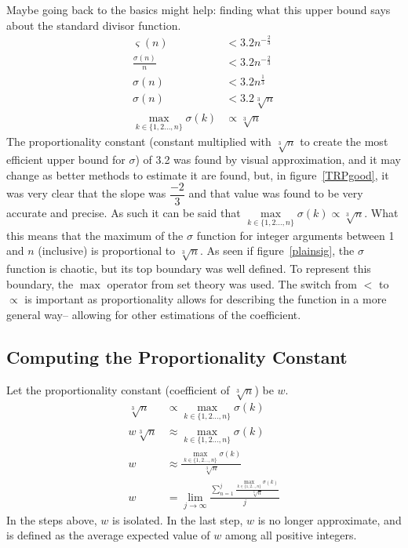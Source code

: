 \documentclass[12pt]{article}
\begin{document}
				Maybe going back to the basics might help: finding what this upper bound says about the standard divisor function.
				\begin{align*}
					\varsigma(n)&< 3.2n^{-\frac{2}{3}}\\
					\frac{\sigma(n)}{n}&< 3.2n^{-\frac{2}{3}}\\
					\sigma(n)&< 3.2n^{\frac{1}{3}}\\
					\sigma(n)&< 3.2\sqrt[3]{n}\\
					\max_{k\in\{1,2\ldots,n\}}\sigma(k)&\propto \sqrt[3]{n}
				\end{align*}
				The proportionality constant (constant multiplied with $\sqrt[3]{n}$ to create the most efficient upper bound for $\sigma$) of 3.2 was found by visual approximation, and it may change as better methods to estimate it are found, but, in figure~\ref{TRPgood}, it was very clear that the slope was $\dfrac{-2}{3}$ and that value was found to be very accurate and precise. As such it can be said that $\max\limits_{k\in\{1,2\ldots,n\}}\sigma(k)\propto \sqrt[3]{n}$. What this means that the maximum of the $\sigma$ function for integer arguments between 1 and $n$ (inclusive) is proportional to $\sqrt[3]{n}$. As seen if figure~\ref{plainsig}, the $\sigma$ function is chaotic, but its top boundary was well defined. To represent this boundary, the $\max$ operator from set theory was used. The switch from $<$ to $\propto$ is important as proportionality allows for describing the function in a more general way-- allowing for other estimations of the coefficient.
				
			\subsection{Computing the Proportionality Constant}
				Let the proportionality constant (coefficient of $\sqrt[3]{n}$) be $w$.
				\begin{align*}
					\sqrt[3]{n}&\propto \max_{k\in\{1,2\ldots,n\}}\sigma(k)\\
					w\sqrt[3]{n}&\approx \max_{k\in\{1,2\ldots,n\}}\sigma(k)\\
					w&\approx \frac{\max\limits_{k\in\{1,2\ldots,n\}}\sigma(k)}{\sqrt[3]{n}}\\
					w&=\lim_{j\to\infty}\frac{\sum\limits_{n=1}^{j}\frac{\max\limits_{k\in\{1,2\ldots,n\}}\sigma(k)}{\sqrt[3]{n}}}{j}
				\end{align*}
				In the steps above, $w$ is isolated. In the last step, $w$ is no longer approximate, and is defined as the average expected value of $w$ among all positive integers.
\end{document}
